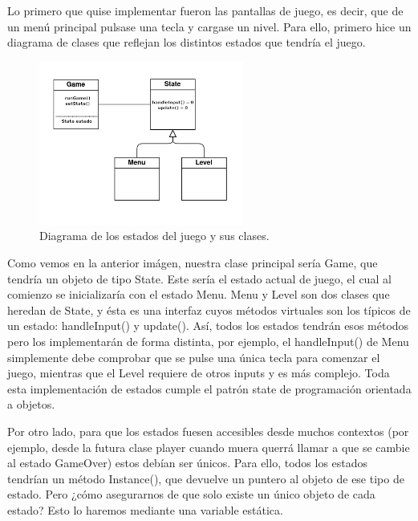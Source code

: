 \vspace{0.5cm}

Lo primero que quise implementar fueron las pantallas de juego, es decir, que de un menú principal pulsase una tecla y cargase un nivel. Para ello, primero hice un diagrama de clases que reflejan los distintos estados que tendría el juego.

\clearpage

\begin{figure}[htbp]
\centering
  \includegraphics[width=0.6\textwidth]{archivos/state.png}
  \caption{Diagrama de los estados del juego y sus clases.}
  \label{fig:borrar}
\end{figure}


\vspace{0.5cm}

Como vemos en la anterior imágen, nuestra clase principal sería Game, que tendría un objeto de tipo State. Este sería el estado actual de juego, el cual al comienzo se inicializaría con el estado Menu. Menu y Level son dos clases que heredan de State, y ésta es una interfaz cuyos métodos virtuales son los típicos de un estado: handleInput() y update(). Así, todos los estados tendrán esos métodos pero los implementarán de forma distinta, por ejemplo, el handleInput() de Menu simplemente debe comprobar que se pulse una única tecla para comenzar el juego, mientras que el Level requiere de otros inputs y es más complejo. Toda esta implementación de estados cumple el patrón state de programación orientada a objetos.

\vspace{0.5cm}

Por otro lado, para que los estados fuesen accesibles desde muchos contextos (por ejemplo, desde la futura clase player cuando muera querrá llamar a que se cambie al estado GameOver) estos debían ser únicos. Para ello, todos los estados tendrían un método Instance(), que devuelve un puntero al objeto de ese tipo de estado. Pero ¿cómo asegurarnos de que solo existe un único objeto de cada estado? Esto lo haremos mediante una variable estática.

